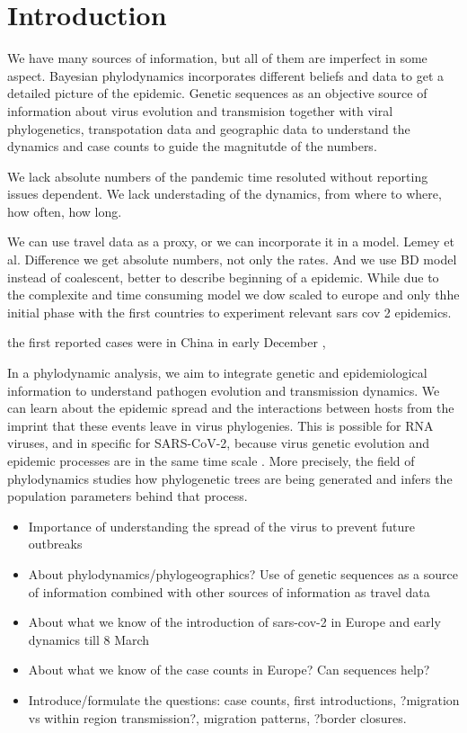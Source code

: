 \chapter{Introduction}

We have many sources of information, but all of them are imperfect in some aspect. Bayesian phylodynamics incorporates different beliefs and data to get a detailed picture of the epidemic. Genetic sequences as an objective source of information about virus evolution and transmision together with viral phylogenetics, transpotation data and geographic data to understand the dynamics and case counts to guide the magnitutde of the numbers.

We lack absolute numbers of the pandemic time resoluted without reporting issues dependent. We lack understading of the dynamics, from where to where, how often, how long.

We can use travel data as a proxy, or we can incorporate it in a model. Lemey et al. Difference we get absolute numbers, not only the rates. And we use BD model instead of coalescent, better to describe beginning of a epidemic. While due to the complexite and time consuming model we dow scaled to europe and only thhe initial phase with the first countries to experiment relevant sars cov 2 epidemics. 

the first reported cases were in China in early December \cite{},


In a phylodynamic analysis, we aim to integrate genetic and epidemiological information to understand pathogen evolution and transmission dynamics. We can learn about the epidemic spread and the interactions between hosts from the imprint that these events leave in virus phylogenies. This is possible for RNA viruses, and in specific for SARS-CoV-2, because virus genetic evolution and epidemic processes are in the same time scale \cite{Grenfell2013} \cite{Volz2014}.  More precisely, the field of phylodynamics studies how phylogenetic trees are being generated and infers the population parameters behind that process. 



\begin{itemize}
\item Importance of understanding the spread of the virus to prevent future outbreaks 

\item About phylodynamics/phylogeographics? Use of genetic sequences as a source of information combined with other sources of information as travel data

\item About what we know of the introduction of sars-cov-2 in Europe and early dynamics till 8 March

\item About what we know of the case counts in Europe? Can sequences help?

\item Introduce/formulate the questions: case counts, first introductions, ?migration vs within region transmission?, migration patterns, ?border closures.
\end{itemize}
